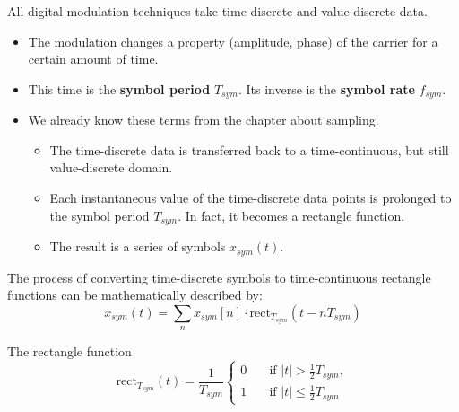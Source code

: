 \begin{refsection}
All digital modulation techniques take time-discrete and value-discrete data.
\begin{itemize}
	\item The modulation changes a property (amplitude, phase) of the carrier for a certain amount of time.
	\item This time is the  \textbf{symbol period} $T_{sym}$. Its inverse is the  \textbf{symbol rate} $f_{sym}$.
	\item We already know these terms from the chapter about sampling.
	\begin{itemize}
		\item The time-discrete data is transferred back to a time-continuous, but still value-discrete domain.
		\item Each instantaneous value of the time-discrete data points is prolonged to the symbol period $T_{sym}$. In fact, it becomes a rectangle function.
		\item The result is a series of symbols $x_{sym}(t)$.
	\end{itemize}
\end{itemize}%

The process of converting time-discrete symbols to time-continuous rectangle functions can be mathematically described by:
\begin{equation}
	x_{sym}(t) = \sum\limits_{n} x_{sym}[n] \cdot \mathrm{rect}_{T_{sym}}\left(t - n T_{sym}\right)
	\label{eq:ch05:sym_rect}
\end{equation}

\begin{excursus}{The rectangle function}
	\begin{equation}
		\mathrm{rect}_{T_{sym}}\left(t\right) = \frac{1}{T_{sym}} \begin{cases}
			0 &\quad \text{if } |t| > \frac{1}{2} T_{sym}, \\
			1 &\quad \text{if } |t| \leq \frac{1}{2} T_{sym}
		\end{cases}
	\end{equation}
\end{excursus}


\end{refsection}
